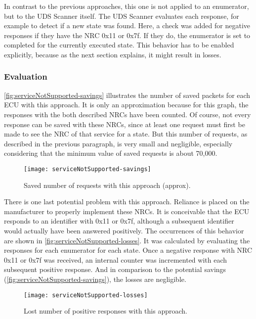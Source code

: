 In contrast to the previous approaches, this one is not applied to an enumerator, but to the UDS Scanner itself. The UDS Scanner evaluates each response, for example to detect if a new state was found. Here, a check was added for negative responses if they have the NRC 0x11 or 0x7f. If they do, the enumerator is set to completed for the currently executed state. This behavior has to be enabled explicitly, because as the next section explains, it might result in losses.

\subsubsection{Evaluation}

\autoref{fig:serviceNotSupported-savings} illustrates the number of saved packets for each ECU with this approach. It is only an approximation because for this graph, the responses with the both described NRCs have been counted. Of course, not every response can be saved with these NRCs, since at least one request must first be made to see the NRC of that service for a state. But this number of requests, as described in the previous paragraph, is very small and negligible, especially considering that the minimum value of saved requests is about 70,000.

\begin{figure}[h]
    \centering
    \texttt{[image: serviceNotSupported-savings]}
    \caption{Saved number of requests with this approach (approx).}
    \label{fig:serviceNotSupported-savings}
\end{figure}

There is one last potential problem with this approach. Reliance is placed on the manufacturer to properly implement these NRCs. It is conceivable that the ECU responds to an identifier with 0x11 or 0x7f, although a subsequent identifier would actually have been answered positively. The occurrences of this behavior are shown in \autoref{fig:serviceNotSupported-losses}. It was calculated by evaluating the responses for each enumerator for each state. Once a negative response with NRC 0x11 or 0x7f was received, an internal counter was incremented with each subsequent positive response.
And in comparison to the potential savings (\autoref{fig:serviceNotSupported-savings}), the losses are negligible.

\begin{figure}[h]
    \centering
    \texttt{[image: serviceNotSupported-losses]}
    \caption{Lost number of positive responses with this approach.}
    \label{fig:serviceNotSupported-losses}
\end{figure}

